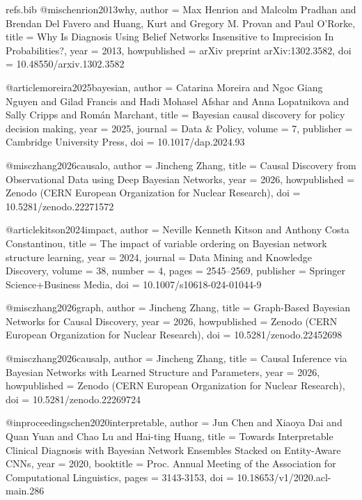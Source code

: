 \begin{filecontents*}[overwrite]{refs.bib}
@misc{henrion2013why,
  author = {Max Henrion and Malcolm Pradhan and Brendan Del Favero and Huang, Kurt and Gregory M. Provan and Paul O'Rorke},
  title = {{Why Is Diagnosis Using Belief Networks Insensitive to Imprecision In Probabilities?}},
  year = {2013},
  howpublished = {arXiv preprint arXiv:1302.3582},
  doi = {10.48550/arxiv.1302.3582}
}

@article{moreira2025bayesian,
  author = {Catarina Moreira and Ngoc Giang Nguyen and Gilad Francis and Hadi Mohasel Afshar and Anna Lopatnikova and Sally Cripps and Rom{\'a}n Marchant},
  title = {{Bayesian causal discovery for policy decision making}},
  year = {2025},
  journal = {Data \& Policy},
  volume = {7},
  publisher = {Cambridge University Press},
  doi = {10.1017/dap.2024.93}
}

@misc{zhang2026causalo,
  author = {Jincheng Zhang},
  title = {{Causal Discovery from Observational Data using Deep Bayesian Networks}},
  year = {2026},
  howpublished = {Zenodo (CERN European Organization for Nuclear Research)},
  doi = {10.5281/zenodo.22271572}
}

@article{kitson2024impact,
  author = {Neville  Kenneth Kitson and Anthony Costa Constantinou},
  title = {{The impact of variable ordering on Bayesian network structure learning}},
  year = {2024},
  journal = {Data Mining and Knowledge Discovery},
  volume = {38},
  number = {4},
  pages = {2545--2569},
  publisher = {Springer Science+Business Media},
  doi = {10.1007/s10618-024-01044-9}
}

@misc{zhang2026graph,
  author = {Jincheng Zhang},
  title = {{Graph-Based Bayesian Networks for Causal Discovery}},
  year = {2026},
  howpublished = {Zenodo (CERN European Organization for Nuclear Research)},
  doi = {10.5281/zenodo.22452698}
}

@misc{zhang2026causalp,
  author = {Jincheng Zhang},
  title = {{Causal Inference via Bayesian Networks with Learned Structure and Parameters}},
  year = {2026},
  howpublished = {Zenodo (CERN European Organization for Nuclear Research)},
  doi = {10.5281/zenodo.22269724}
}

@inproceedings{chen2020interpretable,
  author = {Jun Chen and Xiaoya Dai and Quan Yuan and Chao Lu and Hai-ting Huang},
  title = {{Towards Interpretable Clinical Diagnosis with Bayesian Network Ensembles Stacked on Entity-Aware CNNs}},
  year = {2020},
  booktitle = {Proc. Annual Meeting of the Association for Computational Linguistics},
  pages = {3143-3153},
  doi = {10.18653/v1/2020.acl-main.286}
}


\end{filecontents*}
